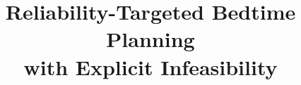 \documentclass[conference]{IEEEtran}
\begin{document}
\title{Reliability-Targeted Bedtime Planning\\with Explicit Infeasibility}

\newif\ifanon
\anontrue                        %

\ifanon
  \author{
  }
\else
  \IfFileExists{authors.local.tex}{}{%
    \PackageError{ichi2027}{authors.local.tex is missing}{%
      Camera-ready needs paper/authors.local.tex (gitignored, so it is not in
      a fresh clone). Recreate it with the \string\author{} block, or set
      \string\anontrue to build the anonymous version.}}
\fi

\maketitle
\end{document}
